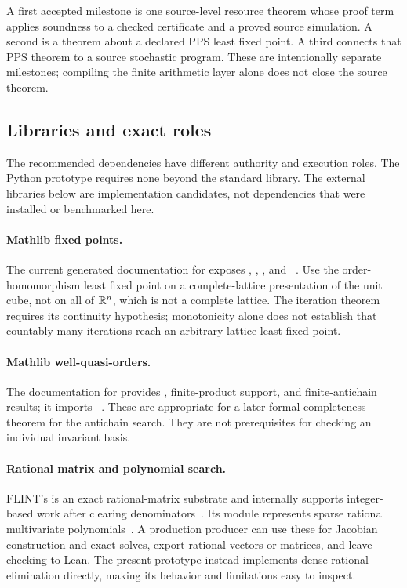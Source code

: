 A first accepted milestone is one source-level resource theorem whose proof term applies  soundness to a checked certificate and a proved source simulation. A second is a theorem about a declared PPS least fixed point. A third connects that PPS theorem to a source stochastic program. These are intentionally separate milestones; compiling the finite arithmetic layer alone does not close the source theorem.

\subsection{Libraries and exact roles}
The recommended dependencies have different authority and execution roles. The Python prototype requires none beyond the standard library. The external libraries below are implementation candidates, not dependencies that were installed or benchmarked here.

\paragraph{Mathlib fixed points.}
The current generated documentation for  exposes , , , and ~\cite{mathlib-fixed}. Use the order-homomorphism least fixed point on a complete-lattice presentation of the unit cube, not on all of $\mathbb R^n$, which is not a complete lattice. The iteration theorem requires its continuity hypothesis; monotonicity alone does not establish that countably many iterations reach an arbitrary lattice least fixed point.

\paragraph{Mathlib well-quasi-orders.}
The documentation for  provides , finite-product support, and finite-antichain results; it imports ~\cite{mathlib-wqo}. These are appropriate for a later formal completeness theorem for the antichain search. They are not prerequisites for checking an individual invariant basis.

\paragraph{Rational matrix and polynomial search.}
FLINT's  is an exact rational-matrix substrate and internally supports integer-based work after clearing denominators~\cite{flint-matrix}. Its  module represents sparse rational multivariate polynomials~\cite{flint-mpoly}. A production producer can use these for Jacobian construction and exact solves, export rational vectors or matrices, and leave checking to Lean. The present prototype instead implements dense rational elimination directly, making its behavior and limitations easy to inspect.

